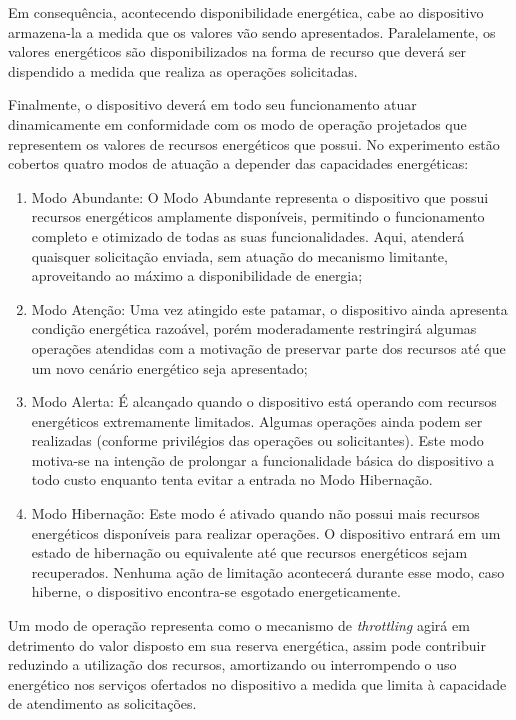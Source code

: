 Em consequência, acontecendo disponibilidade energética, cabe ao dispositivo armazena-la a medida que os valores vão sendo apresentados. Paralelamente, os valores energéticos são disponibilizados na forma de recurso que deverá ser dispendido a medida que realiza as operações solicitadas.

Finalmente, o dispositivo deverá em todo seu funcionamento atuar dinamicamente em conformidade com os modo de operação projetados que representem os valores de recursos energéticos que possui. No experimento estão cobertos quatro modos de atuação a depender das capacidades energéticas:

\begin{enumerate}	
\item Modo Abundante: O Modo Abundante representa o dispositivo que possui recursos energéticos amplamente disponíveis, permitindo o funcionamento completo e otimizado de todas as suas funcionalidades. Aqui, atenderá quaisquer solicitação enviada, sem atuação do mecanismo limitante, aproveitando ao máximo a disponibilidade de energia;
\item Modo Atenção: Uma vez atingido este patamar, o dispositivo ainda apresenta condição energética razoável, porém moderadamente restringirá algumas operações atendidas com a motivação de preservar parte dos recursos até que um novo cenário energético seja apresentado;
\item Modo Alerta: É alcançado quando o dispositivo está operando com recursos energéticos extremamente limitados. Algumas operações ainda podem ser realizadas (conforme privilégios das operações ou solicitantes). Este modo motiva-se na intenção de prolongar a funcionalidade básica do dispositivo a todo custo enquanto tenta evitar a entrada no Modo Hibernação. 
\item Modo Hibernação: Este modo é ativado quando não possui mais recursos energéticos disponíveis para realizar operações. O dispositivo entrará em um estado de hibernação ou equivalente até que recursos energéticos sejam recuperados. Nenhuma ação de limitação acontecerá durante esse modo, caso hiberne,  o dispositivo encontra-se esgotado energeticamente.
\end{enumerate}

Um modo de operação representa como o mecanismo de \textit{throttling} agirá em detrimento do valor disposto em sua reserva energética, assim pode contribuir reduzindo a utilização dos recursos, amortizando ou interrompendo o uso energético nos serviços ofertados no dispositivo a medida que limita à capacidade de atendimento as solicitações. 

